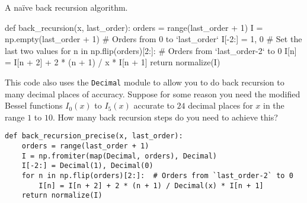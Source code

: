 \begin{algorithm}
    \caption{A naïve back recursion algorithm.}
    \label{lst:back_recursion}
    \begin{pythoncode}
        def back_recursion(x, last_order):
            orders = range(last_order + 1)
            I = np.empty(last_order + 1)  # Orders from 0 to `last_order`
            I[-2:] = 1, 0  # Set the last two values
            for n in np.flip(orders)[2:]:  # Orders from `last_order-2` to 0
                I[n] = I[n + 2] + 2 * (n + 1) / x * I[n + 1]
            return normalize(I)
    \end{pythoncode}
\end{algorithm}

\Question This code also uses the \texttt{Decimal} module to allow you to do back recursion to many
decimal places of accuracy. Suppose for some reason you need the modified Bessel functions
$I_0(x)$ to $I_5(x)$ accurate to $24$ decimal places for $x$ in the range $1$ to $10$. How
many back recursion steps do you need to achieve this?

\begin{verbatim}
def back_recursion_precise(x, last_order):
    orders = range(last_order + 1)
    I = np.fromiter(map(Decimal, orders), Decimal)
    I[-2:] = Decimal(1), Decimal(0)
    for n in np.flip(orders)[2:]:  # Orders from `last_order-2` to 0
        I[n] = I[n + 2] + 2 * (n + 1) / Decimal(x) * I[n + 1]
    return normalize(I)
\end{verbatim}

